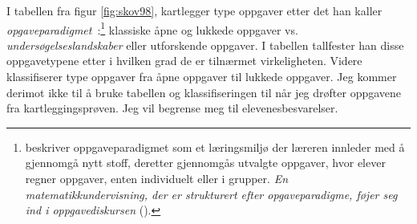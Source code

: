 \documentclass[main.tex]{subfiles}
\begin{document}
I tabellen fra figur \ref{fig:skov98}, kartlegger  type oppgaver etter det han kaller 
\mbox{\emph{opgaveparadigmet} :}\footnote[2]{ beskriver oppgaveparadigmet som et læringsmiljø der læreren 
innleder med å gjennomgå nytt stoff, deretter gjennomgås utvalgte oppgaver, hvor elever regner oppgaver, enten 
individuelt eller i grupper. \emph{En matematikkundervisning, der er strukturert efter opgaveparadigme, føjer seg ind i 
\guillemotleft oppgavediskursen\guillemotright} ().} klassiske åpne og lukkede oppgaver vs. 
\emph{undersøgelseslandskaber} eller utforskende oppgaver. I tabellen tallfester han disse oppgavetypene etter i hvilken 
grad de er tilnærmet virkeligheten. Videre klassifiserer  type oppgaver fra åpne oppgaver til 
lukkede oppgaver. Jeg kommer derimot ikke til å bruke tabellen og klassifiseringen til  når 
jeg drøfter oppgavene fra kartleggingsprøven. Jeg vil begrense meg til elevenesbesvarelser.
\end{document}
